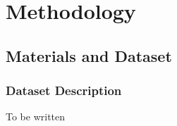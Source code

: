 


\chapter{Methodology} %

\label{ChapterMethodology} %


\section{Materials and Dataset}

\subsection{Dataset Description}

To be written